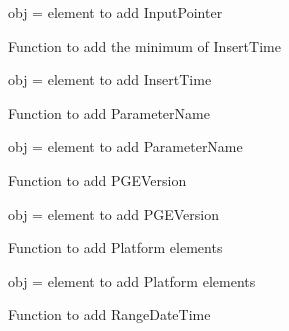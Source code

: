 \documentclass[a4paper,11pt,oneside]{sphinxmanual}
\begin{document}
\begin{fulllineitems}
\begin{fulllineitems}
obj = element to add InputPointer

\end{fulllineitems}


\begin{fulllineitems}
\label{pymodis/pymodis:pymodis.parsemodis.parseModisMulti.valInsTime}
Function to add the minimum of InsertTime

obj = element to add InsertTime

\end{fulllineitems}


\begin{fulllineitems}
\label{pymodis/pymodis:pymodis.parsemodis.parseModisMulti.valMeasuredParameter}
Function to add ParameterName

obj = element to add ParameterName

\end{fulllineitems}


\begin{fulllineitems}
\label{pymodis/pymodis:pymodis.parsemodis.parseModisMulti.valPGEVersion}
Function to add PGEVersion

obj = element to add PGEVersion

\end{fulllineitems}


\begin{fulllineitems}
\label{pymodis/pymodis:pymodis.parsemodis.parseModisMulti.valPlatform}
Function to add Platform elements

obj = element to add Platform elements

\end{fulllineitems}


\begin{fulllineitems}
\label{pymodis/pymodis:pymodis.parsemodis.parseModisMulti.valRangeTime}
Function to add RangeDateTime


\end{fulllineitems}
\end{fulllineitems}
\end{document}
